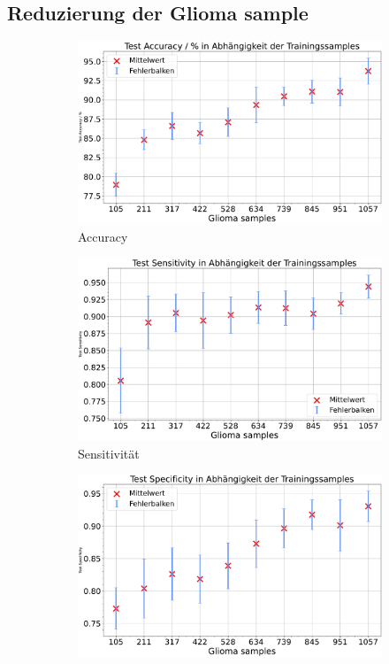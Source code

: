 \subsection{Reduzierung der Glioma sample}
\begin{figure}[htbp]
  \centering
  \begin{subfigure}[b]{0.48\textwidth}
    \centering
    \includegraphics[width=\textwidth]{plots/Reduzierung-Gli + Balnce_Accuracy_mean.pdf}
    \caption{Accuracy}
    \label{fig:gli-red-acc}
  \end{subfigure}
  \begin{subfigure}[b]{0.48\textwidth}
    \centering
    \includegraphics[width=\textwidth]{plots/Reduzierung-Gli + Balnce_Sensitivity_mean.pdf}
    \caption{Sensitivität}
    \label{fig:gli-red-sens}
  \end{subfigure}
  \begin{subfigure}[b]{0.48\textwidth}
    \centering
    \includegraphics[width=\textwidth]{plots/Reduzierung-Gli + Balnce_Specificity_mean.pdf}

\end{subfigure}
\end{figure}
